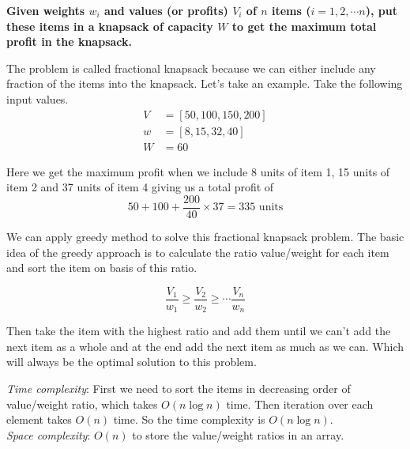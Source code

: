 \documentclass[a4paper,11pt]{book}
\begin{document}
\noindent \textbf{Given weights $w_i$ and values (or profits) $V_i$ of $n$ items ($i = 1,2,\cdots n$), put these items in a knapsack of capacity $W$ to get the maximum total profit in the knapsack.}

\vspace{3mm}

\noindent The problem is called fractional knapsack because we can either include any fraction of the items into the knapsack. Let’s take an example. Take the following input values.
\begin{align*}
V &= [50,100,150,200]\\
w &= [8,15,32,40]\\
W &= 60
\end{align*}

\noindent Here we get the maximum profit when we include 8 units of item 1, 15 units of item 2 and 37 units of item 4 giving us a total profit of 
$$50 + 100 + \dfrac{200}{40}\times 37= 335 \text{ units}$$

\noindent We can apply greedy method to solve this fractional knapsack problem. The basic idea of the greedy approach is to calculate the ratio value/weight for each item and sort the item on basis of this ratio.

$$\dfrac{V_1}{w_1} \geq \dfrac{V_2}{w_2} \geq \cdots \dfrac{V_n}{w_n}$$

\noindent Then take the item with the highest ratio and add them until we can’t add the next item as a whole and at the end add the next item as much as we can. Which will always be the optimal solution to this problem.

\vspace{5mm}
\noindent \textit{Time complexity}: First we need to sort the items in decreasing order of value/weight ratio, which takes $O(n\log n)$ time. Then iteration over each element takes $O(n)$ time. So the time complexity is $O(n\log n)$.\\
\noindent \textit{Space complexity}: $O(n)$ to store the value/weight ratios in an array.
\end{document}

